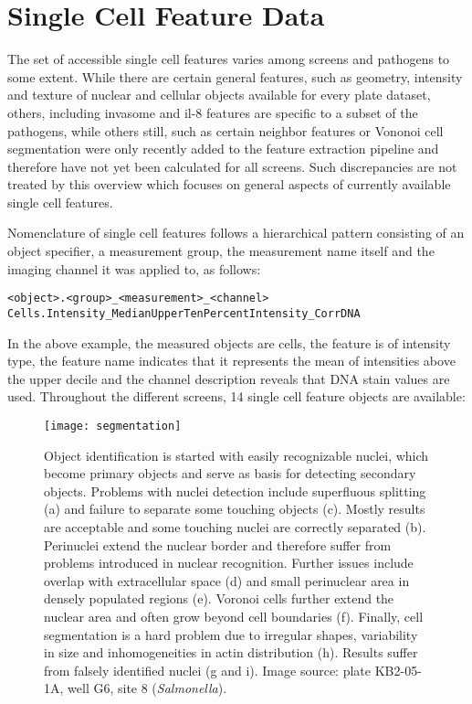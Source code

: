 \section{Single Cell Feature Data}
\label{sec:scf-data}
The set of accessible single cell features varies among screens and pathogens to some extent. While there are certain general features, such as geometry, intensity and texture of nuclear and cellular objects available for every plate dataset, others, including invasome and \gls{il-8} features are specific to a subset of the pathogens, while others still, such as certain neighbor features or Vononoi cell segmentation were only recently added to the feature extraction pipeline and therefore have not yet been calculated for all screens. Such discrepancies are not treated by this overview which focuses on general aspects of currently available single cell features.

Nomenclature of single cell features follows a hierarchical pattern consisting of an object specifier, a measurement group, the measurement name itself and the imaging channel it was applied to, as follows:
\begin{center}
\texttt{<object>.<group>\_<measurement>\_<channel>}
\texttt{Cells.Intensity\_MedianUpperTenPercentIntensity\_CorrDNA}
\end{center}
In the above example, the measured objects are cells, the feature is of intensity type, the feature name indicates that it represents the mean of intensities above the upper decile and the channel description reveals that DNA stain values are used. Throughout the different screens, 14 single cell feature objects are available:

\begin{figure}
  \centering
  \texttt{[image: segmentation]}
  \caption[Object detection of nuclei, perinuclei, Voronoi cells and cell bodies along with potential pitfalls.]{Object identification is started with easily recognizable nuclei, which become primary objects and serve as basis for detecting secondary objects. Problems with nuclei detection include superfluous splitting (a) and failure to separate some touching objects (c). Mostly results are acceptable and some touching nuclei are correctly separated (b). Perinuclei extend the nuclear border and therefore suffer from problems introduced in nuclear recognition. Further issues include overlap with extracellular space (d) and small perinuclear area in densely populated regions (e). Voronoi cells further extend the nuclear area and often grow beyond cell boundaries (f). Finally, cell segmentation is a hard problem due to irregular shapes, variability in size and inhomogeneities in actin distribution (h). Results suffer from falsely identified nuclei (g and i). Image source: plate KB2-05-1A, well G6, site 8 (\textit{Salmonella}).}
  \label{fig:segmentation}
\end{figure}

